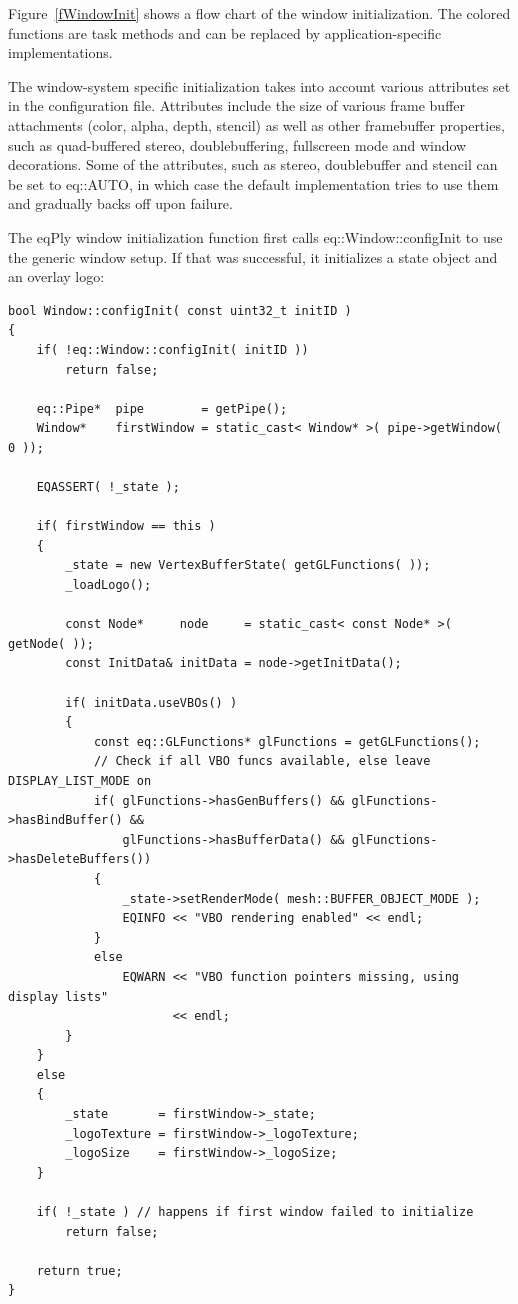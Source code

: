 \documentclass[10pt,a4]{scrartcl}
\newcommand{\fig}[1]{Figure~\ref{#1}}
\begin{document}
\fig{fWindowInit} shows a flow chart of the window initialization. The
colored functions are task methods and can be replaced by
application-specific implementations.

The window-system specific initialization takes into account various
attributes set in the configuration file. Attributes include the size of
various frame buffer attachments (color, alpha, depth, stencil) as well
as other framebuffer properties, such as quad-buffered stereo,
doublebuffering, fullscreen mode and window decorations. Some of the
attributes, such as stereo, doublebuffer and stencil can be set to
\textsf{eq::AUTO}, in which case the default implementation tries to use
them and gradually backs off upon failure.

The \textsf{eqPly} window initialization function first calls
\textsf{eq::Window::configInit} to use the generic window setup. If that
was successful, it initializes a state object and an overlay logo:

{\footnotesize\begin{lstlisting}
bool Window::configInit( const uint32_t initID )
{
    if( !eq::Window::configInit( initID ))
        return false;

    eq::Pipe*  pipe        = getPipe();
    Window*    firstWindow = static_cast< Window* >( pipe->getWindow( 0 ));

    EQASSERT( !_state );

    if( firstWindow == this )
    {
        _state = new VertexBufferState( getGLFunctions( ));
        _loadLogo();

        const Node*     node     = static_cast< const Node* >( getNode( ));
        const InitData& initData = node->getInitData();

        if( initData.useVBOs() )
        {
            const eq::GLFunctions* glFunctions = getGLFunctions();
            // Check if all VBO funcs available, else leave DISPLAY_LIST_MODE on
            if( glFunctions->hasGenBuffers() && glFunctions->hasBindBuffer() &&
                glFunctions->hasBufferData() && glFunctions->hasDeleteBuffers())
            {
                _state->setRenderMode( mesh::BUFFER_OBJECT_MODE );
                EQINFO << "VBO rendering enabled" << endl;
            }
            else
                EQWARN << "VBO function pointers missing, using display lists" 
                       << endl;
        }
    }
    else
    {
        _state       = firstWindow->_state;
        _logoTexture = firstWindow->_logoTexture;
        _logoSize    = firstWindow->_logoSize;
    }

    if( !_state ) // happens if first window failed to initialize
        return false;
    
    return true;
}
\end{lstlisting}}%
\end{document}
